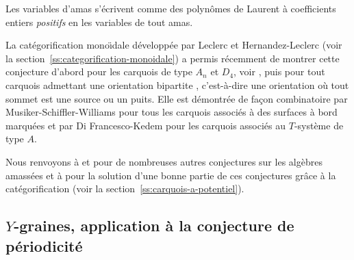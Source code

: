 \documentclass[brochure,12pt]{bourbaki}
\numberwithin{equation}{subsection}
\numberwithin{theorem}{section}
\begin{document}
\begin{conj}  \label{conj:positivite}
Les variables d'amas s'\'ecrivent comme des polyn\^omes
de Laurent \`a coefficients entiers {\em positifs} en les variables
de tout amas.
\end{conj}

La cat\'egorification mono\"{\i}dale d\'evelopp\'ee par Leclerc
\cite{Leclerc08a} et Hernandez-Leclerc \cite{HernandezLeclerc09}
(voir la section~\ref{ss:categorification-monoidale}) a permis r\'ecemment de montrer cette
conjecture d'abord pour les carquois de type $A_n$ et $D_4$, voir
\cite{HernandezLeclerc09}, puis pour tout carquois admettant une
orientation bipartite \cite{Nakajima09}, c'est-\`a-dire une
orientation o\`u tout sommet est une source ou un puits. Elle est
d\'emontr\'ee de fa\c{c}on combinatoire par
Musiker-Schiffler-Williams \cite{MusikerSchifflerWilliams09} pour
tous les carquois associ\'es \`a des surfaces \`a bord marqu\'ees
\cite{FominShapiroThurston08} et par Di Francesco-Kedem \cite{DiFrancescoKedem09}
pour les carquois associ\'es au $T$-syst\`eme de type $A$.

Nous renvoyons \`a \cite{FominZelevinsky03a} et
\cite{FominZelevinsky07} pour de nombreuses autres conjectures sur
les alg\`ebres amass\'ees et \`a \cite{DerksenWeymanZelevinsky09}
pour la solution d'une bonne partie de ces conjectures gr\^ace \`a
la cat\'egorification (voir la section~\ref{ss:carquois-a-potentiel}).


\subsection{$Y$-graines, application \`a la conjecture de p\'eriodicit\'e}
\label{ss:Y-graines}
\end{document}
